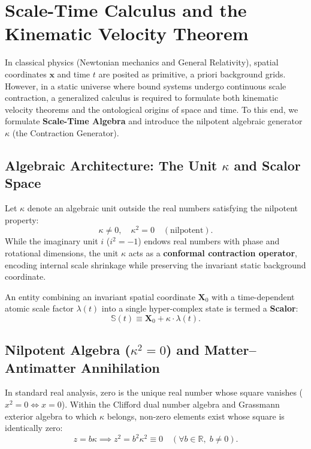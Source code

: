 \section{Scale-Time Calculus and the Kinematic Velocity Theorem}
\label{sec:olcek_kalkulusu_ana}

In classical physics (Newtonian mechanics and General Relativity), spatial coordinates $\mathbf{x}$ and time $t$ are posited as primitive, a priori background grids. However, in a static universe where bound systems undergo continuous scale contraction, a generalized calculus is required to formulate both kinematic velocity theorems and the ontological origins of space and time. To this end, we formulate \textbf{Scale-Time Algebra} and introduce the nilpotent algebraic generator $\kappa$ (the Contraction Generator).

\subsection{Algebraic Architecture: The Unit \texorpdfstring{$\kappa$}{kappa} and Scalor Space}
Let $\kappa$ denote an algebraic unit outside the real numbers satisfying the nilpotent property:
\begin{equation}
    \kappa \neq 0, \quad \kappa^2 = 0 \quad (\text{nilpotent}).
    \label{eq:kappa_main}
\end{equation}
While the imaginary unit $i$ ($i^2 = -1$) endows real numbers with phase and rotational dimensions, the unit $\kappa$ acts as a \textbf{conformal contraction operator}, encoding internal scale shrinkage while preserving the invariant static background coordinate.

An entity combining an invariant spatial coordinate $\mathbf{X}_0$ with a time-dependent atomic scale factor $\lambda(t)$ into a single hyper-complex state is termed a \textbf{Scalor}:
\begin{equation}
    \mathbb{S}(t) \equiv \mathbf{X}_0 + \kappa \cdot \lambda(t).
    \label{eq:skalor_main}
\end{equation}

\subsection{Nilpotent Algebra (\texorpdfstring{$\kappa^2 = 0$}{kappa\texttwosuperior{} = 0}) and Matter--Antimatter Annihilation}
\label{sec:nilpotent_main}
In standard real analysis, zero is the unique real number whose square vanishes ($x^2 = 0 \iff x = 0$). Within the Clifford dual number algebra and Grassmann exterior algebra to which $\kappa$ belongs, non-zero elements exist whose square is identically zero:
\begin{equation}
    z = b\kappa \implies z^2 = b^2 \kappa^2 \equiv 0 \quad (\forall b \in \mathbb{R}, \; b \neq 0).
    \label{eq:nilpotent_kare}
\end{equation}


